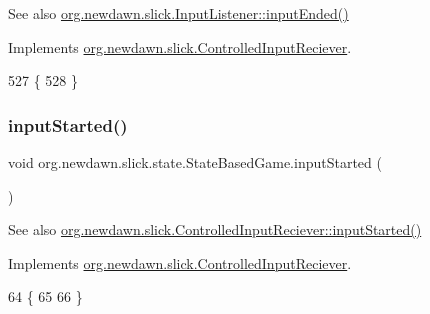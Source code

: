 \begin{DoxySeeAlso}{See also}
\mbox{\hyperlink{interfaceorg_1_1newdawn_1_1slick_1_1_controlled_input_reciever_a61c6cde7cbf28a6969cafe3ec4f1c121}{org.\+newdawn.\+slick.\+Input\+Listener\+::input\+Ended()}} 
\end{DoxySeeAlso}


Implements \mbox{\hyperlink{interfaceorg_1_1newdawn_1_1slick_1_1_controlled_input_reciever_a61c6cde7cbf28a6969cafe3ec4f1c121}{org.\+newdawn.\+slick.\+Controlled\+Input\+Reciever}}.


\begin{DoxyCode}
527                              \{
528     \}
\end{DoxyCode}
\mbox{\label{classorg_1_1newdawn_1_1slick_1_1state_1_1_state_based_game_a1a3ebc498cd4eee9660aae669746ed4f}} 
\subsubsection{\texorpdfstring{input\+Started()}{inputStarted()}}
{\footnotesize\ttfamily void org.\+newdawn.\+slick.\+state.\+State\+Based\+Game.\+input\+Started (\begin{DoxyParamCaption}{ }\end{DoxyParamCaption})\hspace{0.3cm}{\ttfamily [inline]}}

\begin{DoxySeeAlso}{See also}
\mbox{\hyperlink{interfaceorg_1_1newdawn_1_1slick_1_1_controlled_input_reciever_a718de21e9cd22f4c48ee87b5b8b32ed6}{org.\+newdawn.\+slick.\+Controlled\+Input\+Reciever\+::input\+Started()}} 
\end{DoxySeeAlso}


Implements \mbox{\hyperlink{interfaceorg_1_1newdawn_1_1slick_1_1_controlled_input_reciever_a718de21e9cd22f4c48ee87b5b8b32ed6}{org.\+newdawn.\+slick.\+Controlled\+Input\+Reciever}}.


\begin{DoxyCode}
64                                \{
65         
66     \}
\end{DoxyCode}
\mbox{\label{classorg_1_1newdawn_1_1slick_1_1state_1_1_state_based_game_ab5c47ea171308ec7dac850d2739d79e4}} 
